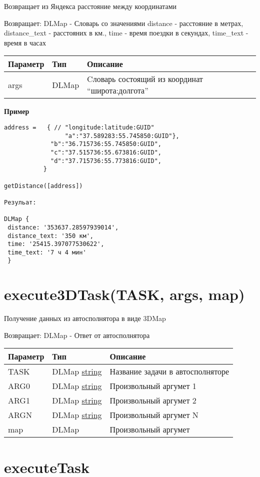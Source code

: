 Возвращает из Яндекса расстояние между координатами

Возвращает: DLMap - Словарь со значениями distance - расстояние в
метрах, distance\_text - расстояних в км., time - время поездки в
секундах, time\_text - время в часах

\begin{longtable}[]{@{}lll@{}}
\toprule
Параметр & Тип & Описание\tabularnewline
\midrule
\endhead
args & DLMap & Cловарь состоящий из координат
``широта:долгота''\tabularnewline
\bottomrule
\end{longtable}

\textbf{Пример}

\begin{verbatim}
address =   { // "longitude:latitude:GUID"
                 "a":"37.589283:55.745850:GUID"},
             "b":"36.715736:55.745850:GUID",
             "c":"37.515736:55.673816:GUID",
             "d":"37.715736:55.773816:GUID",
           }

getDistance([address])

Резульат:

DLMap {
 distance: '353637.28597939014',
 distance_text: '350 км',
 time: '25415.397077530622',
 time_text: '7 ч 4 мин'
 }
\end{verbatim}

\hypertarget{execute3dtasktask-arg0-arg1-argn-map-dlmap}{%
\section{execute3DTask(TASK, args, map)}\label{execute3dtasktask-arg0-arg1-argn-map-dlmap}}

Получение данных из автосполнятора в виде 3DMap

Возвращает: DLMap - Ответ от автосполнятора

\begin{longtable}[]{@{}lll@{}}
\toprule
Параметр & Тип & Описание\tabularnewline
\midrule
\endhead
TASK & DLMap \textbar{} \protect\hyperlink{string}{string} & Название
задачи в автосполняторе\tabularnewline
ARG0 & DLMap \textbar{} \protect\hyperlink{string}{string} &
Произвольный аргумет 1\tabularnewline
ARG1 & DLMap \textbar{} \protect\hyperlink{string}{string} &
Произвольный аргумет 2\tabularnewline
ARGN & DLMap \textbar{} \protect\hyperlink{string}{string} &
Произвольный аргумет N\tabularnewline
map & DLMap & Произвольный аргумет\tabularnewline
\bottomrule
\end{longtable}

\hypertarget{executetasktask-arg0-arg1-argn-object}{%
\section{executeTask}\label{executetasktask-arg0-arg1-argn-object}}

